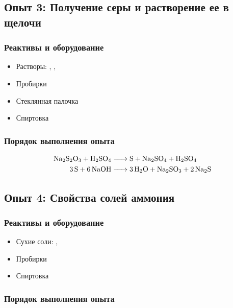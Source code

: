 \documentclass[a4paper, 12pt]{article}
\begin{document}
\subsection{Опыт 3: Получение серы и растворение ее в щелочи}

\subsubsection{Реактивы и оборудование}

\begin{itemize}
	\item Растворы: , , 
	
	\item Пробирки
	
	\item Стеклянная палочка
	
	\item Спиртовка
\end{itemize}

\subsubsection{Порядок выполнения опыта}

\begin{align}
	\ce{Na2S2O3 + H2SO4 &-> S + Na2SO4 + H2SO4}\\
	\ce{3S + 6NaOH &-> 3 H2O + Na2SO3 + 2 Na2S}
\end{align}

\subsection{Опыт 4: Свойства солей аммония}

\subsubsection{Реактивы и оборудование}

\begin{itemize}
	\item Сухие соли: , 
	
	\item Пробирки
	
	\item Спиртовка
\end{itemize}

\subsubsection{Порядок выполнения опыта}
\end{document}
